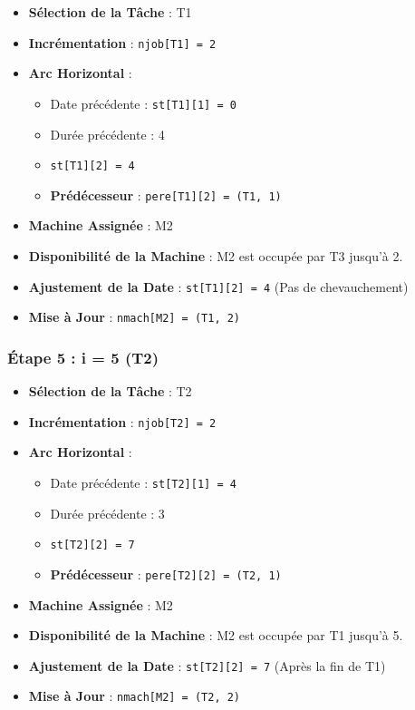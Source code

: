 \documentclass[12pt]{article}
\begin{document}
\begin{itemize}
    \item \textbf{Sélection de la Tâche} : T1
    \item \textbf{Incrémentation} : \texttt{njob[T1] = 2}
    \item \textbf{Arc Horizontal} :
    \begin{itemize}
        \item Date précédente : \texttt{st[T1][1] = 0}
        \item Durée précédente : 4
        \item \texttt{st[T1][2] = 4}
        \item \textbf{Prédécesseur} : \texttt{pere[T1][2] = (T1, 1)}
    \end{itemize}
    \item \textbf{Machine Assignée} : M2
    \item \textbf{Disponibilité de la Machine} : M2 est occupée par T3 jusqu'à 2.
    \item \textbf{Ajustement de la Date} : \texttt{st[T1][2] = 4} (Pas de chevauchement)
    \item \textbf{Mise à Jour} : \texttt{nmach[M2] = (T1, 2)}
\end{itemize}

\subsubsection{Étape 5 : i = 5 (T2)}

\begin{itemize}
    \item \textbf{Sélection de la Tâche} : T2
    \item \textbf{Incrémentation} : \texttt{njob[T2] = 2}
    \item \textbf{Arc Horizontal} :
    \begin{itemize}
        \item Date précédente : \texttt{st[T2][1] = 4}
        \item Durée précédente : 3
        \item \texttt{st[T2][2] = 7}
        \item \textbf{Prédécesseur} : \texttt{pere[T2][2] = (T2, 1)}
    \end{itemize}
    \item \textbf{Machine Assignée} : M2
    \item \textbf{Disponibilité de la Machine} : M2 est occupée par T1 jusqu'à 5.
    \item \textbf{Ajustement de la Date} : \texttt{st[T2][2] = 7} (Après la fin de T1)
    \item \textbf{Mise à Jour} : \texttt{nmach[M2] = (T2, 2)}
\end{itemize}
\end{document}
